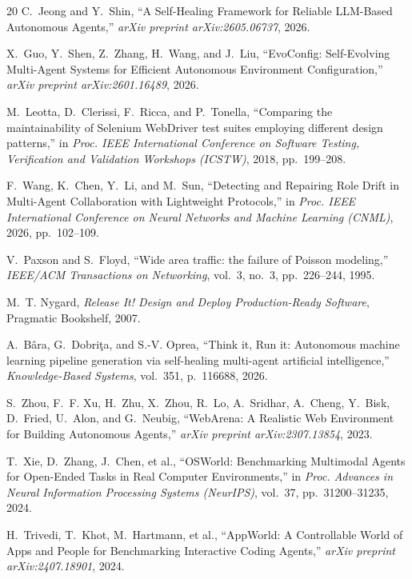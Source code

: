\documentclass[conference]{IEEEtran}
\begin{document}
\begin{thebibliography}{20}
C.~Jeong and Y.~Shin,
``A Self-Healing Framework for Reliable LLM-Based Autonomous Agents,''
\textit{arXiv preprint arXiv:2605.06737}, 2026.

X.~Guo, Y.~Shen, Z.~Zhang, H.~Wang, and J.~Liu,
``EvoConfig: Self-Evolving Multi-Agent Systems for Efficient Autonomous Environment Configuration,''
\textit{arXiv preprint arXiv:2601.16489}, 2026.

M.~Leotta, D.~Clerissi, F.~Ricca, and P.~Tonella,
``Comparing the maintainability of Selenium WebDriver test suites employing different design patterns,''
in \textit{Proc. IEEE International Conference on Software Testing, Verification and Validation Workshops (ICSTW)}, 2018, pp.~199--208.

F.~Wang, K.~Chen, Y.~Li, and M.~Sun,
``Detecting and Repairing Role Drift in Multi-Agent Collaboration with Lightweight Protocols,''
in \textit{Proc. IEEE International Conference on Neural Networks and Machine Learning (CNML)}, 2026, pp.~102--109.

V.~Paxson and S.~Floyd,
``Wide area traffic: the failure of Poisson modeling,''
\textit{IEEE/ACM Transactions on Networking}, vol.~3, no.~3, pp.~226--244, 1995.

M.~T. Nygard,
\textit{Release It! Design and Deploy Production-Ready Software},
Pragmatic Bookshelf, 2007.

A.~B{\^a}ra, G.~Dobri{\c{t}}a, and S.-V. Oprea,
``Think it, Run it: Autonomous machine learning pipeline generation via self-healing multi-agent artificial intelligence,''
\textit{Knowledge-Based Systems}, vol.~351, p.~116688, 2026.

S.~Zhou, F.~F. Xu, H.~Zhu, X.~Zhou, R.~Lo, A.~Sridhar, A.~Cheng, Y.~Bisk, D.~Fried, U.~Alon, and G.~Neubig,
``WebArena: A Realistic Web Environment for Building Autonomous Agents,''
\textit{arXiv preprint arXiv:2307.13854}, 2023.

T.~Xie, D.~Zhang, J.~Chen, et al.,
``OSWorld: Benchmarking Multimodal Agents for Open-Ended Tasks in Real Computer Environments,''
in \textit{Proc. Advances in Neural Information Processing Systems (NeurIPS)}, vol.~37, pp.~31200--31235, 2024.

H.~Trivedi, T.~Khot, M.~Hartmann, et al.,
``AppWorld: A Controllable World of Apps and People for Benchmarking Interactive Coding Agents,''
\textit{arXiv preprint arXiv:2407.18901}, 2024.

\end{thebibliography}
\end{document}
